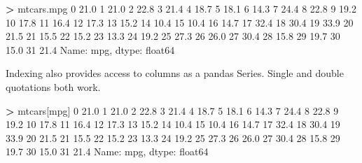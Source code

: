 \documentclass[
]{book}
\newenvironment{Shaded}{\begin{snugshade}}{\end{snugshade}}
\newcommand{\DecValTok}[1]{\textcolor[rgb]{0.00,0.00,0.81}{#1}}
\newcommand{\FloatTok}[1]{\textcolor[rgb]{0.00,0.00,0.81}{#1}}
\newcommand{\NormalTok}[1]{#1}
\newcommand{\OperatorTok}[1]{\textcolor[rgb]{0.81,0.36,0.00}{\textbf{#1}}}
\newcommand{\StringTok}[1]{\textcolor[rgb]{0.31,0.60,0.02}{#1}}
\begin{document}
\begin{Shaded}
\begin{Highlighting}[]
\OperatorTok{\textgreater{}}\NormalTok{ mtcars.mpg}
\DecValTok{0}     \FloatTok{21.0}
\DecValTok{1}     \FloatTok{21.0}
\DecValTok{2}     \FloatTok{22.8}
\DecValTok{3}     \FloatTok{21.4}
\DecValTok{4}     \FloatTok{18.7}
\DecValTok{5}     \FloatTok{18.1}
\DecValTok{6}     \FloatTok{14.3}
\DecValTok{7}     \FloatTok{24.4}
\DecValTok{8}     \FloatTok{22.8}
\DecValTok{9}     \FloatTok{19.2}
\DecValTok{10}    \FloatTok{17.8}
\DecValTok{11}    \FloatTok{16.4}
\DecValTok{12}    \FloatTok{17.3}
\DecValTok{13}    \FloatTok{15.2}
\DecValTok{14}    \FloatTok{10.4}
\DecValTok{15}    \FloatTok{10.4}
\DecValTok{16}    \FloatTok{14.7}
\DecValTok{17}    \FloatTok{32.4}
\DecValTok{18}    \FloatTok{30.4}
\DecValTok{19}    \FloatTok{33.9}
\DecValTok{20}    \FloatTok{21.5}
\DecValTok{21}    \FloatTok{15.5}
\DecValTok{22}    \FloatTok{15.2}
\DecValTok{23}    \FloatTok{13.3}
\DecValTok{24}    \FloatTok{19.2}
\DecValTok{25}    \FloatTok{27.3}
\DecValTok{26}    \FloatTok{26.0}
\DecValTok{27}    \FloatTok{30.4}
\DecValTok{28}    \FloatTok{15.8}
\DecValTok{29}    \FloatTok{19.7}
\DecValTok{30}    \FloatTok{15.0}
\DecValTok{31}    \FloatTok{21.4}
\NormalTok{Name: mpg, dtype: float64}
\end{Highlighting}
\end{Shaded}

Indexing also provides access to columns as a pandas Series. Single and double quotations both work.

\begin{Shaded}
\begin{Highlighting}[]
\OperatorTok{\textgreater{}}\NormalTok{ mtcars[}\StringTok{\textquotesingle{}mpg\textquotesingle{}}\NormalTok{]}
\DecValTok{0}     \FloatTok{21.0}
\DecValTok{1}     \FloatTok{21.0}
\DecValTok{2}     \FloatTok{22.8}
\DecValTok{3}     \FloatTok{21.4}
\DecValTok{4}     \FloatTok{18.7}
\DecValTok{5}     \FloatTok{18.1}
\DecValTok{6}     \FloatTok{14.3}
\DecValTok{7}     \FloatTok{24.4}
\DecValTok{8}     \FloatTok{22.8}
\DecValTok{9}     \FloatTok{19.2}
\DecValTok{10}    \FloatTok{17.8}
\DecValTok{11}    \FloatTok{16.4}
\DecValTok{12}    \FloatTok{17.3}
\DecValTok{13}    \FloatTok{15.2}
\DecValTok{14}    \FloatTok{10.4}
\DecValTok{15}    \FloatTok{10.4}
\DecValTok{16}    \FloatTok{14.7}
\DecValTok{17}    \FloatTok{32.4}
\DecValTok{18}    \FloatTok{30.4}
\DecValTok{19}    \FloatTok{33.9}
\DecValTok{20}    \FloatTok{21.5}
\DecValTok{21}    \FloatTok{15.5}
\DecValTok{22}    \FloatTok{15.2}
\DecValTok{23}    \FloatTok{13.3}
\DecValTok{24}    \FloatTok{19.2}
\DecValTok{25}    \FloatTok{27.3}
\DecValTok{26}    \FloatTok{26.0}
\DecValTok{27}    \FloatTok{30.4}
\DecValTok{28}    \FloatTok{15.8}
\DecValTok{29}    \FloatTok{19.7}
\DecValTok{30}    \FloatTok{15.0}
\DecValTok{31}    \FloatTok{21.4}
\NormalTok{Name: mpg, dtype: float64}
\end{Highlighting}
\end{Shaded}
\end{document}
